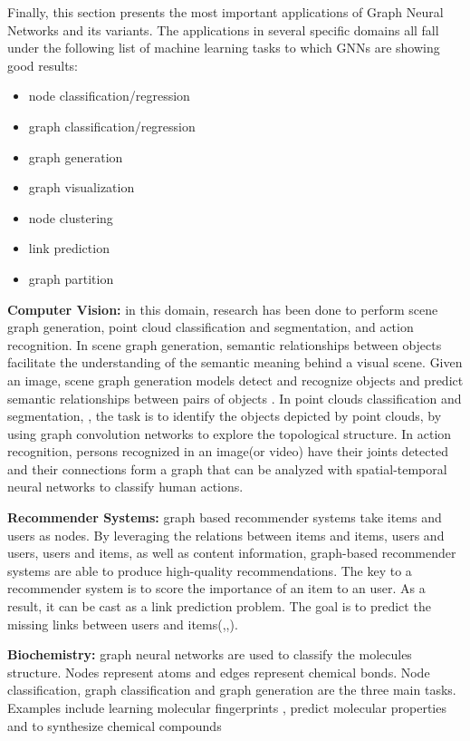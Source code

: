 Finally, this section presents the most important applications of Graph Neural Networks and its variants. The applications in several specific domains all fall under the following list of machine learning tasks to which GNNs are showing good results:
\begin{itemize}
	\item node classification/regression
	\item graph classification/regression
	\item graph generation
	\item graph visualization
	\item node clustering
	\item link prediction
	\item graph partition
\end{itemize}


\textbf{Computer Vision:} in this domain, research has been done to perform scene graph generation, point cloud classification and segmentation, and action recognition. In scene graph generation, semantic relationships between objects facilitate the understanding of the semantic meaning behind a visual scene. Given an image, scene graph generation models detect and recognize objects and predict semantic relationships between pairs of objects \cite{121}. In point clouds classification and segmentation, \cite{125}, the task is to identify the objects depicted by point clouds, by using graph convolution networks to explore the topological structure. In action recognition, persons recognized in an image(or video) have their joints detected and their connections form a graph that can be analyzed with spatial-temporal neural networks to classify human actions.

\textbf{Recommender Systems:} graph based recommender systems take items and users as nodes. By leveraging the relations between items and items, users and users, users and items, as well as content information, graph-based recommender systems are able to produce high-quality recommendations. The key to a recommender system is to score the importance of an item to an user. As a result, it can be cast as a link prediction problem. The goal is to predict the missing links between users and items(\cite{9},\cite{10},\cite{11}).

\textbf{Biochemistry:} graph neural networks are used to classify the molecules structure. Nodes represent atoms and edges represent chemical bonds. Node classification, graph classification and graph generation are the three main tasks. Examples include learning molecular fingerprints \cite{52}, predict molecular properties \cite{mpnn} and to synthesize chemical compounds \cite{65}


